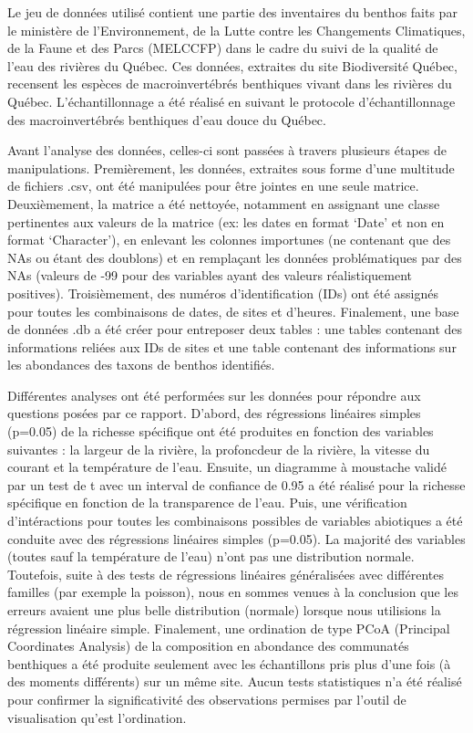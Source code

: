 \documentclass[9pt,twocolumn,twoside,]{pnas-new}
\begin{document}
Le jeu de données utilisé contient une partie des inventaires du benthos
faits par le ministère de l'Environnement, de la Lutte contre les
Changements Climatiques, de la Faune et des Parcs (MELCCFP) dans le
cadre du suivi de la qualité de l'eau des rivières du Québec. Ces
données, extraites du site Biodiversité Québec, recensent les espèces de
macroinvertébrés benthiques vivant dans les rivières du Québec.
L'échantillonnage a été réalisé en suivant le protocole
d'échantillonnage des macroinvertébrés benthiques d'eau douce du Québec.

Avant l'analyse des données, celles-ci sont passées à travers plusieurs
étapes de manipulations. Premièrement, les données, extraites sous forme
d'une multitude de fichiers .csv, ont été manipulées pour être jointes
en une seule matrice. Deuxièmement, la matrice a été nettoyée, notamment
en assignant une classe pertinentes aux valeurs de la matrice (ex: les
dates en format `Date' et non en format `Character'), en enlevant les
colonnes importunes (ne contenant que des NAs ou étant des doublons) et
en remplaçant les données problématiques par des NAs (valeurs de -99
pour des variables ayant des valeurs réalistiquement positives).
Troisièmement, des numéros d'identification (IDs) ont été assignés pour
toutes les combinaisons de dates, de sites et d'heures. Finalement, une
base de données .db a été créer pour entreposer deux tables : une tables
contenant des informations reliées aux IDs de sites et une table
contenant des informations sur les abondances des taxons de benthos
identifiés.

Différentes analyses ont été performées sur les données pour répondre
aux questions posées par ce rapport. D'abord, des régressions linéaires
simples (p=0.05) de la richesse spécifique ont été produites en fonction
des variables suivantes : la largeur de la rivière, la profoncdeur de la
rivière, la vitesse du courant et la température de l'eau. Ensuite, un
diagramme à moustache validé par un test de t avec un interval de
confiance de 0.95 a été réalisé pour la richesse spécifique en fonction
de la transparence de l'eau. Puis, une vérification d'intéractions pour
toutes les combinaisons possibles de variables abiotiques a été conduite
avec des régressions linéaires simples (p=0.05). La majorité des
variables (toutes sauf la température de l'eau) n'ont pas une
distribution normale. Toutefois, suite à des tests de régressions
linéaires généralisées avec différentes familles (par exemple la
poisson), nous en sommes venues à la conclusion que les erreurs avaient
une plus belle distribution (normale) lorsque nous utilisions la
régression linéaire simple. Finalement, une ordination de type PCoA
(Principal Coordinates Analysis) de la composition en abondance des
communatés benthiques a été produite seulement avec les échantillons
pris plus d'une fois (à des moments différents) sur un même site. Aucun
tests statistiques n'a été réalisé pour confirmer la significativité des
observations permises par l'outil de visualisation qu'est l'ordination.
\end{document}
